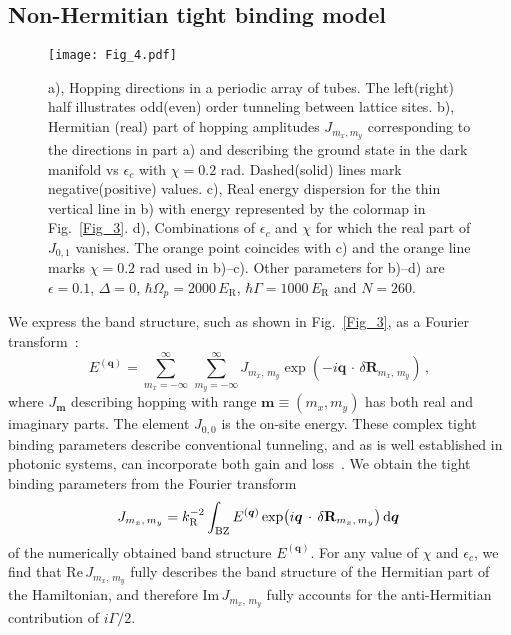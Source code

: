 \documentclass[aps,pra,twocolumn,showpacs,superscriptaddress,floatfix,longbibliography]{revtex4-1}
\def\kr{k_{\mathrm R}}                            			%
\def\Er{E_{\mathrm R}}                            			%
\def\ex{\boldsymbol{e}_x}
\def\ey{\boldsymbol{e}_y}
\begin{document}
\subsection{Non-Hermitian tight binding model}

\begin{figure}[t]
\centering
  \texttt{[image: Fig\_4.pdf]}
  \caption{a), Hopping directions in a periodic array of tubes. The left(right) half illustrates odd(even) order tunneling between lattice sites.
  b), Hermitian (real) part of hopping amplitudes $J_{m_x, m_y}$ corresponding to the directions in part a) and describing the ground state in the dark manifold vs $\epsilon_c$ with $\chi = 0.2$ rad. Dashed(solid) lines mark negative(positive) values. 
  c), Real energy dispersion for the thin vertical line in b) with energy represented by the colormap in Fig.~\ref{Fig_3}.
  d), Combinations of $\epsilon_c$ and $\chi$ for which the real part of $J_{0,1}$ vanishes. The orange point coincides with c) and the orange line marks $\chi = 0.2$ rad used in b)--c). Other parameters for b)--d) are $\epsilon = 0.1$, $\Delta=0$, $\hbar \Omega_p = 2000 \, \Er$, $\hbar \Gamma = 1000 \, \Er$ and $N=260$.
  }
  \label{Fig_4}
\end{figure}

We express the band structure, such as shown in Fig.~\ref{Fig_3}, as a Fourier transform~\cite{Goringe1997, Delerue2001, Bellec2013}:
%
\begin{equation}
E^{(\boldsymbol{q})} = \sum_{m_x=-\infty}^{\infty} \, \sum_{m_y=-\infty}^{\infty} J_{m_x, \, m_y}\exp(-i \boldsymbol{q} \, \cdot \, \delta \mathbf{R}_{m_x, \, m_y}) \, ,
\label{eq:E_k_2D}
\end{equation}
%
where $J_{\mathbf{m}}$ describing hopping with range ${\mathbf{m} \equiv (m_x, m_y)}$ has both real and imaginary parts.
The element $J_{0,0}$ is the on-site energy.
These complex tight binding parameters describe conventional tunneling, and as is well established in photonic systems, can incorporate both gain and loss~\cite{Rudner2009, Schomerus2013, El-Ganainy2018, Lieu2018, Ashida2020, Han2021}.
We obtain the tight binding parameters from the Fourier transform
%
\begin{equation}
J_{m_x , \, m_y}= \kr^{-2} \int_{\rm BZ} E^{(\boldsymbol{q})} \exp(i \boldsymbol{q} \, \cdot \, \delta \textbf{R}_{m_x , \, m_y}) \, \mathrm{d} \boldsymbol{q} \, \label{eq:t_n_2D}
\end{equation}
%
of the numerically obtained band structure $E^{(\boldsymbol{q})}$. For any value of $\chi$ and $\epsilon_c$, we find that $ \text{Re} \, J_{m_x , \, m_y}$ fully describes the band structure of the Hermitian part of the Hamiltonian, and therefore $\text{Im} \, J_{m_x , \, m_y}$ fully accounts for the anti-Hermitian contribution of $i \Gamma/2$.
\end{document}
